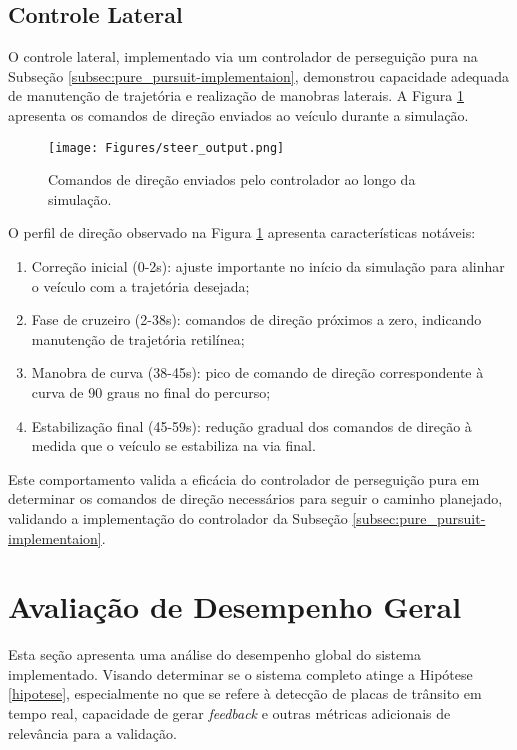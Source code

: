 \subsection{Controle Lateral} \label{subsec:controle_lateral}

O controle lateral, implementado via um controlador de perseguição pura na Subseção \ref{subsec:pure_pursuit-implementaion}, demonstrou capacidade adequada de manutenção de trajetória e realização de manobras laterais. A Figura \ref{fig:steer} apresenta os comandos de direção enviados ao veículo durante a simulação.

\begin{figure}[H]
\centering
\texttt{[image: Figures/steer\_output.png]}
\caption{Comandos de direção enviados pelo controlador ao longo da simulação.}
\label{fig:steer}
\end{figure}

O perfil de direção observado na Figura \ref{fig:steer} apresenta características notáveis:
\begin{enumerate}
    \item Correção inicial (0-2s): ajuste importante no início da simulação para alinhar o veículo com a trajetória desejada;
    \item Fase de cruzeiro (2-38s): comandos de direção próximos a zero, indicando manutenção de trajetória retilínea;
    \item Manobra de curva (38-45s): pico de comando de direção correspondente à curva de 90 graus no final do percurso;
    \item Estabilização final (45-59s): redução gradual dos comandos de direção à medida que o veículo se estabiliza na via final.
\end{enumerate}

Este comportamento valida a eficácia do controlador de perseguição pura em determinar os comandos de direção necessários para seguir o caminho planejado, validando a implementação do controlador da Subseção \ref{subsec:pure_pursuit-implementaion}.

\section{Avaliação de Desempenho Geral} \label{sec:desempenho_integrado}

Esta seção apresenta uma análise do desempenho global do sistema implementado. Visando determinar se o sistema completo atinge a Hipótese \ref{hipotese}, especialmente no que se refere à detecção de placas de trânsito em tempo real, capacidade de gerar \textit{feedback} e outras métricas adicionais de relevância para a validação. 


